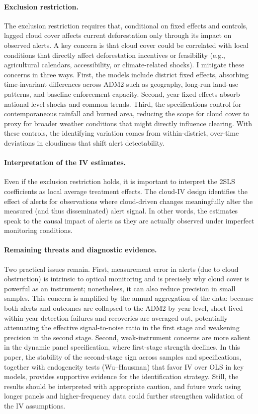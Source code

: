 \documentclass[hidelinks,12pt]{article}
\begin{document}
\paragraph{Exclusion restriction.}
The exclusion restriction requires that, conditional on fixed effects and controls, lagged cloud cover affects current deforestation only through its impact on observed alerts. A key concern is that cloud cover could be correlated with local conditions that directly affect deforestation incentives or feasibility (e.g., agricultural calendars, accessibility, or climate-related shocks). I mitigate these concerns in three ways. First, the models include district fixed effects, absorbing time-invariant differences across ADM2 such as geography, long-run land-use patterns, and baseline enforcement capacity. Second, year fixed effects absorb national-level shocks and common trends. Third, the specifications control for contemporaneous rainfall and burned area, reducing the scope for cloud cover to proxy for broader weather conditions that might directly influence clearing. With these controls, the identifying variation comes from within-district, over-time deviations in cloudiness that shift alert detectability.

\paragraph{Interpretation of the IV estimates.}
Even if the exclusion restriction holds, it is important to interpret the 2SLS coefficients as local average treatment effects. The cloud-IV design identifies the effect of alerts for observations where cloud-driven changes meaningfully alter the measured (and thus disseminated) alert signal. In other words, the estimates speak to the causal impact of alerts as they are actually observed under imperfect monitoring conditions.

\paragraph{Remaining threats and diagnostic evidence.}
Two practical issues remain. First, measurement error in alerts (due to cloud obstruction) is intrinsic to optical monitoring and is precisely why cloud cover is powerful as an instrument; nonetheless, it can also reduce precision in small samples. This concern is amplified by the annual aggregation of the data: because both alerts and outcomes are collapsed to the ADM2-by-year level, short-lived within-year detection failures and recoveries are averaged out, potentially attenuating the effective signal-to-noise ratio in the first stage and weakening precision in the second stage.
Second, weak-instrument concerns are more salient in the dynamic panel specification, where first-stage strength declines. In this paper, the stability of the second-stage sign across samples and specifications, together with endogeneity tests (Wu--Hausman) that favor IV over OLS in key models, provides supportive evidence for the identification strategy. Still, the results should be interpreted with appropriate caution, and future work using longer panels and higher-frequency data could further strengthen validation of the IV assumptions.
\end{document}
